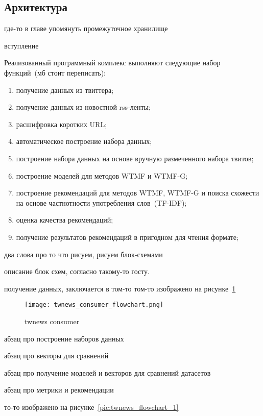 \subsection{Архитектура}
    где-то в главе упомянуть промежуточное хранилище

    вступление

    Реализованный программный комплекс выполняют следующие набор функций~(мб стоит переписать):
    \begin{enumerate}
        \item получение данных из твиттера;
        \item получение данных из новостной rss-ленты;
        \item расшифровка коротких URL;
        \item автоматическое построение набора данных;
        \item построение набора данных на основе вручную размеченного набора твитов;
        \item построение моделей для методов WTMF и WTMF-G;
        \item построение рекомендаций для методов WTMF, WTMF-G и поиска схожести на основе частнотности употребления слов~(TF-IDF);
        \item оценка качества рекомендаций;
        \item получение результатов рекомендаций в пригодном для чтения формате;
    \end{enumerate}

    два слова про то что рисуем, рисуем блок-схемами
    
    описание блок схем, согласно такому-то госту. 

    получение данных, заключается в том-то том-то изображено на рисунке~\ref{pic:consumer_flowchart}
    \begin{figure}[h!]
            \center
            \texttt{[image: twnews\_consumer\_flowchart.png]}
            \caption{twnews consumer}
            \label{pic:consumer_flowchart}
    \end{figure}

    абзац про построение наборов данных

    абзац про векторы для сравнений

    абзац про получение моделей и векторов для сравнений датасетов

    абзац про метрики и рекомендации

    то-то изображено на рисунке~\ref{pic:twnews_flowchart_1}

